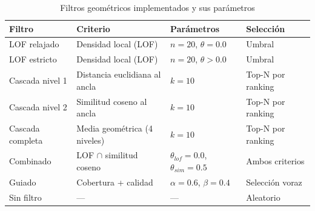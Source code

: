 \begin{table}[htbp]
\centering
\caption{Filtros geométricos implementados y sus parámetros}
\label{tab:filters_summary}
\small
\begin{tabular}{llll}
\toprule
\textbf{Filtro} & \textbf{Criterio} & \textbf{Parámetros} & \textbf{Selección} \\
\midrule
LOF relajado     & Densidad local (LOF)          & $n=20$, $\theta=0.0$  & Umbral \\
LOF estricto     & Densidad local (LOF)          & $n=20$, $\theta>0.0$  & Umbral \\
Cascada nivel 1  & Distancia euclidiana al ancla  & $k=10$               & Top-N por ranking \\
Cascada nivel 2  & Similitud coseno al ancla      & $k=10$               & Top-N por ranking \\
Cascada completa & Media geométrica (4 niveles)   & $k=10$               & Top-N por ranking \\
Combinado        & LOF $\cap$ similitud coseno    & $\theta_{lof}=0.0$, $\theta_{sim}=0.5$ & Ambos criterios \\
Guiado           & Cobertura + calidad            & $\alpha=0.6$, $\beta=0.4$ & Selección voraz \\
Sin filtro       & ---                            & ---                  & Aleatorio \\
\bottomrule
\end{tabular}
\end{table}
